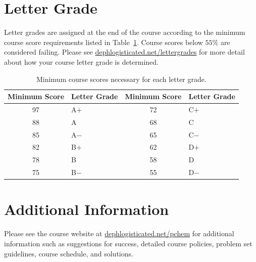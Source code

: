 \documentclass[letterpaper,oneside,onecolumn,11pt,article]{memoir}
\begin{document}
\section{Letter Grade}
Letter grades are assigned at the end of the course according to the minimum course score requirements listed in Table~\ref{tab:lettergrades}. Course scores below $55\%$ are considered failing. Please see \href{https://dephlogisticated.net/lettergrades}{dephlogisticated.net/lettergrades} for more detail about how your course letter grade is determined. 
\begin{table}[h]
\caption{\sffamily Minimum course scores necessary for each letter grade.}
\label{tab:lettergrades}
\begin{tabular}{cl||cl} \toprule
\textbf{Minimum Score} & \textbf{Letter Grade} & \textbf{Minimum Score} & \textbf{Letter Grade} \\ \hline
97 & \hspace{0.3in}A$+$ & 72 & \hspace{0.3in}C$+$ \\
88 & \hspace{0.3in}A & 68 & \hspace{0.3in}C \\
85 & \hspace{0.3in}A$-$ & 65 & \hspace{0.3in}C$-$ \\
82 & \hspace{0.3in}B$+$ & 62 & \hspace{0.3in}D$+$ \\
78 & \hspace{0.3in}B & 58 & \hspace{0.3in}D \\
75 & \hspace{0.3in}B$-$ & 55 & \hspace{0.3in}D$-$ \\
\bottomrule
\end{tabular}
\end{table}
%
%
\section{Additional Information}
Please see the course website at \href{http://dephlogisticated.net/pchem}{dephlogisticated.net/pchem} for additional information such as suggestions for success, detailed course policies, problem set guidelines, course schedule, and solutions. 
%
%
\end{document}
